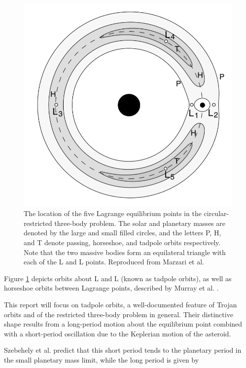 \documentclass[11pt, a4paper,twocolumn]{article} %
\begin{document}
\begin{figure}[h]
	\centering
	\includegraphics[width=\linewidth]{Figures/lagrange_points}
	\caption{The location of the five Lagrange equilibrium points in the circular-restricted three-body problem. The solar and planetary masses are denoted by the large and small filled circles, and the letters P, H, and T denote passing, horseshoe, and tadpole orbits respectively. Note that the two massive bodies form an equilateral triangle with each of the L and L points. Reproduced from Marzari et al. \cite{Marzari2002}}
	\label{fig:lagrangepoints}
\end{figure}

Figure \ref{fig:lagrangepoints} depicts orbits about L and L (known as tadpole orbits), as well as horseshoe orbits between Lagrange points, described by Murray et al. \cite{Murray1999}.

This report will focus on tadpole orbits, a well-documented feature of Trojan orbits \cite{Garfinkel1983} \cite{Dermott1981} and of the restricted three-body problem in general. Their distinctive shape results from a long-period motion about the equilibrium point combined with a short-period oscillation due to the Keplerian motion of the asteroid. 

Szebehely et al. \cite{Szebehely1969} predict that this short period tends to the planetary period in the small planetary mass limit, while the long period is given by
\end{document}
